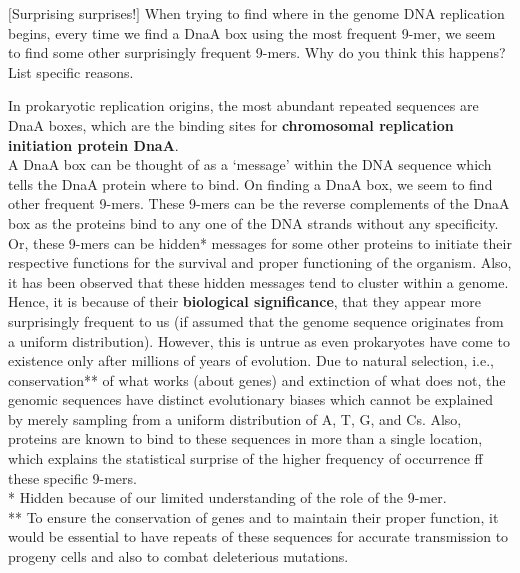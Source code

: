 \documentclass[solution,addpoints,12pt]{exam}
\begin{document}
\begin{questions}
\question[5] $[$Surprising surprises!$]$ When trying to find where in the genome DNA replication begins, every time we find a DnaA box using the most frequent 9-mer, we seem to find some other surprisingly frequent 9-mers. Why do you think this happens? List specific reasons. 
\begin{solution}
In prokaryotic replication origins, the most abundant repeated sequences are DnaA boxes, which are the binding sites for \textbf{chromosomal replication initiation protein DnaA}.
\vspace{3mm}
\\
A DnaA box can be thought of as a ‘message’ within the DNA sequence which tells the DnaA protein where to bind. On finding a DnaA box, we seem to find other frequent 9-mers. These 9-mers can be the reverse complements of the DnaA box as the proteins bind to any one of the DNA strands without any specificity. Or, these 9-mers can be hidden* messages for some other proteins to initiate their respective functions for the survival and proper functioning of the organism. Also, it has been observed that these hidden messages tend to cluster within a genome. 
\vspace{3mm}
\\
Hence, it is because of their  \textbf{biological significance}, that they appear more surprisingly frequent to us (if assumed that the genome sequence originates from a uniform distribution). However, this is untrue as even prokaryotes have come to existence only after millions of years of evolution. Due to natural selection, i.e., conservation** of what works (about genes) and extinction of what does not, the genomic sequences have distinct evolutionary biases which cannot be explained by merely sampling from a uniform distribution of A, T, G, and Cs. Also, proteins are known to bind to these sequences in more than a single location, which explains the statistical surprise of the higher frequency of occurrence ff these specific 9-mers. \textsuperscript{\cite{10.1111/j.1574-6976.2011.00300.x, bioinf_book}}
\vspace{3mm}
\\
\footnotesize{* Hidden because of our limited understanding of the role of the 9-mer.}\\
\footnotesize{** To ensure the conservation of genes and to maintain their proper function, it would be essential to have repeats of these sequences for accurate transmission to progeny cells and also to combat deleterious mutations.}


\end{solution}
\end{questions}
\end{document}
